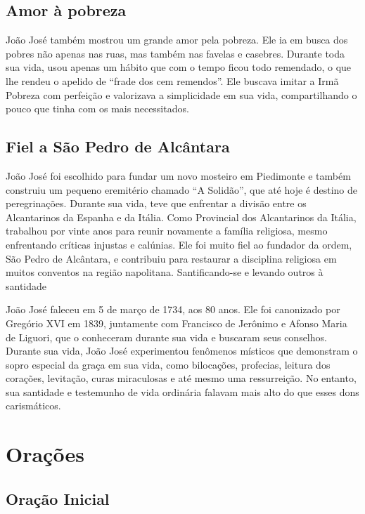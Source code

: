 \documentclass[a4paper,14pt]{extarticle} \usepackage[utf8]{inputenc}
\begin{document}
\subsection{Amor à pobreza}

João José também mostrou um grande amor pela pobreza. Ele ia em busca dos pobres não apenas nas ruas, mas também nas favelas e casebres. Durante toda sua vida, usou apenas um hábito que com o tempo ficou todo remendado, o que lhe rendeu o apelido de “frade dos cem remendos”. Ele buscava imitar a Irmã Pobreza com perfeição e valorizava a simplicidade em sua vida, compartilhando o pouco que tinha com os mais necessitados.

\subsection{Fiel a São Pedro de Alcântara}


João José foi escolhido para fundar um novo mosteiro em Piedimonte e também construiu um pequeno eremitério chamado “A Solidão”, que até hoje é destino de peregrinações. Durante sua vida, teve que enfrentar a divisão entre os Alcantarinos da Espanha e da Itália. Como Provincial dos Alcantarinos da Itália, trabalhou por vinte anos para reunir novamente a família religiosa, mesmo enfrentando críticas injustas e calúnias. Ele foi muito fiel ao fundador da ordem, São Pedro de Alcântara, e contribuiu para restaurar a disciplina religiosa em muitos conventos na região napolitana.
Santificando-se e levando outros à santidade

João José faleceu em 5 de março de 1734, aos 80 anos. Ele foi canonizado por Gregório XVI em 1839, juntamente com Francisco de Jerônimo e Afonso Maria de Liguori, que o conheceram durante sua vida e buscaram seus conselhos. Durante sua vida, João José experimentou fenômenos místicos que demonstram o sopro especial da graça em sua vida, como bilocações, profecias, leitura dos corações, levitação, curas miraculosas e até mesmo uma ressurreição. No entanto, sua santidade e testemunho de vida ordinária falavam mais alto do que esses dons carismáticos.

\newpage

\vfill

\section{Orações}
\subsection{Oração Inicial}\label{sub:inicial} %
\end{document}
